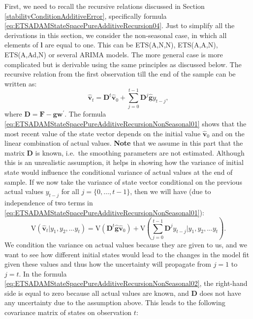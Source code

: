 \documentclass[
]{book}
\theoremstyle{definition}
\theoremstyle{definition}
\theoremstyle{definition}
\theoremstyle{definition}
\theoremstyle{remark}
\begin{document}
First, we need to recall the recursive relations discussed in Section \ref{stabilityConditionAdditiveError}, specifically formula \eqref{eq:ETSADAMStateSpacePureAdditiveRecursion04}. Just to simplify all the derivations in this section, we consider the non-seasonal case, in which all elements of \(\mathbf{l}\) are equal to one. This can be ETS(A,N,N), ETS(A,A,N), ETS(A,Ad,N) or several ARIMA models. The more general case is more complicated but is derivable using the same principles as discussed below. The recursive relation from the first observation till the end of the sample can be written as:
\begin{equation}
    \hat{\mathbf{v}}_{t} = \mathbf{D}^{t} \hat{\mathbf{v}}_{0} + \sum_{j=0}^{t-1} \mathbf{D}^{j} \hat{\mathbf{g}} y_{t-j} ,
  \label{eq:ETSADAMStateSpacePureAdditiveRecursionNonSeasonal01}
\end{equation}
where \(\mathbf{D}=\mathbf{F} -\mathbf{g}\mathbf{w}^\prime\). The formula \eqref{eq:ETSADAMStateSpacePureAdditiveRecursionNonSeasonal01} shows that the most recent value of the state vector depends on the initial value \(\hat{\mathbf{v}}_{0}\) and on the linear combination of actual values. \textbf{Note} that we assume in this part that the matrix \(\mathbf{D}\) is known, i.e.~the smoothing parameters are not estimated. Although this is an unrealistic assumption, it helps in showing how the variance of initial state would influence the conditional variance of actual values at the end of sample. If we now take the variance of state vector conditional on the previous actual values \(y_{t-j}\) for all \(j=\{0, \dots, t-1 \}\), then we will have (due to independence of two terms in \eqref{eq:ETSADAMStateSpacePureAdditiveRecursionNonSeasonal01}):
\begin{equation}
    \mathrm{V}(\hat{\mathbf{v}}_{t} | y_1, y_2, \dots y_t) = \mathrm{V}\left( \mathbf{D}^{t} \hat{\mathbf{g}} \hat{\mathbf{v}}_{0} \right) + \mathrm{V}\left(\sum_{j=0}^{t-1} \mathbf{D}^{j} y_{t-j} | y_1, y_2, \dots y_t \right) .
  \label{eq:ETSADAMStateSpacePureAdditiveRecursionNonSeasonal02}
\end{equation}
We condition the variance on actual values because they are given to us, and we want to see how different initial states would lead to the changes in the model fit given these values and thus how the uncertainty will propagate from \(j=1\) to \(j=t\). In the formula \eqref{eq:ETSADAMStateSpacePureAdditiveRecursionNonSeasonal02}, the right-hand side is equal to zero because all actual values are known, and \(\mathbf{D}\) does not have any uncertainty due to the assumption above. This leads to the following covariance matrix of states on observation \(t\):
\end{document}
